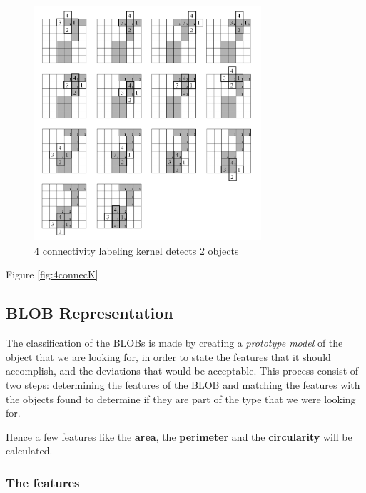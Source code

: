 \begin{figure}[htbp]
\centering
\includegraphics[width=0.75\textwidth]{Pictures/Theory/4connec_kernel.png}
\caption{4 connectivity labeling kernel detects 2 objects}
\label{fig:4connecK}
\end{figure}



Figure \eqref{fig:4connecK}

\subsection{BLOB Representation}
The classification of the BLOBs is made by creating a \textit{prototype model} of the object that we are looking for, in order to state the features that it should accomplish, and the deviations that would be acceptable. This process consist of two steps: determining the features of the BLOB and matching the features with the objects found to determine if they are part of the type that we were looking for.

Hence a few features like the \textbf{area}, the \textbf{perimeter} and the \textbf{circularity} will be calculated.
\subsubsection{The features}

